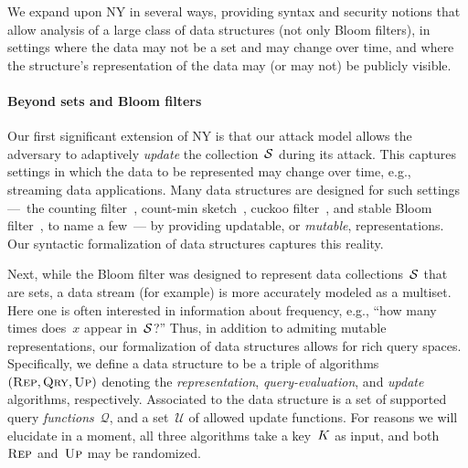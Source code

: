 We expand upon NY in several ways, providing syntax and security
notions that allow analysis of a large class of data structures (not
only Bloom filters), in settings where the data may not be a set and
may change over time, and where the structure's representation of the data may (or may not) be publicly visible.
 
\paragraph{Beyond sets and Bloom filters}
Our first significant extension of NY is that our attack model allows the adversary to adaptively \emph{update} the
collection~$\mathcal{S}$ during its attack.  This captures settings in which
the data to be represented may change over time, e.g., streaming data applications.
Many data structures are designed for such settings ---~the counting filter~\cite{fan2000summary}, count-min
sketch~\cite{cormode2005improved}, cuckoo filter~\cite{fan2014cuckoo}, and
stable Bloom filter~\cite{deng2006approximately}, to name a few~--- by providing
updatable, or \emph{mutable}, representations.  Our syntactic formalization of
data structures captures this reality. 

%
Next, while the Bloom filter was designed to represent data collections~$\mathcal{S}$
that are sets, a data stream (for example) is more accurately 
modeled as a multiset.  Here one is often interested in information
about frequency, e.g., ``how many times does~$x$ appear
in~$\mathcal{S}$?''
Thus, in addition to admiting mutable representations, our
formalization of data structures allows for rich
query spaces.  Specifically, we define a data structure to be a triple of algorithms $(\textnormal{\textsc{Rep}},
\textnormal{\textsc{Qry}}, \textnormal{\textsc{Up}})$ denoting the \emph{representation}, \emph{query-evaluation}, and
\emph{update} algorithms, respectively. Associated to the data structure is a
set of supported query \emph{functions}~$\mathcal{Q}$, and a set~$\mathcal{U}$
of allowed update functions.  For reasons we will elucidate in a moment, all
three algorithms take a key~$K$ as input, and both~$\textnormal{\textsc{Rep}}$ and~$\textnormal{\textsc{Up}}$ may be
randomized.

